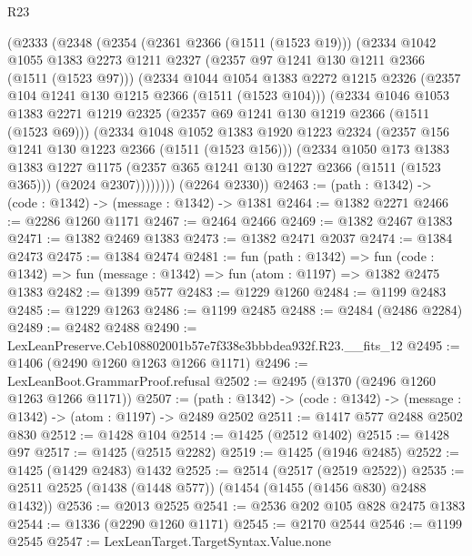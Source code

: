 \begin{lexlean}{R23}
\begin{coremodule}
    (@2333
      (@2348
        (@2354
          (@2361 @2366 (@1511 (@1523 @19)))
          (@2334
            @1042
            @1055
            @1383
            @2273
            @1211
            @2327
            (@2357 @97 @1241 @130 @1211 @2366 (@1511 (@1523 @97)))
            (@2334
              @1044
              @1054
              @1383
              @2272
              @1215
              @2326
              (@2357 @104 @1241 @130 @1215 @2366 (@1511 (@1523 @104)))
              (@2334
                @1046
                @1053
                @1383
                @2271
                @1219
                @2325
                (@2357 @69 @1241 @130 @1219 @2366 (@1511 (@1523 @69)))
                (@2334
                  @1048
                  @1052
                  @1383
                  @1920
                  @1223
                  @2324
                  (@2357 @156 @1241 @130 @1223 @2366 (@1511 (@1523 @156)))
                  (@2334
                    @1050
                    @173
                    @1383
                    @1383
                    @1227
                    @1175
                    (@2357 @365 @1241 @130 @1227 @2366 (@1511 (@1523 @365)))
                    (@2024 @2307))))))))
      (@2264 @2330))
@2463 := (path : @1342) -> (code : @1342) -> (message : @1342) -> @1381
@2464 := @1382 @2271
@2466 := @2286 @1260 @1171
@2467 := @2464 @2466
@2469 := @1382 @2467 @1383
@2471 := @1382 @2469 @1383
@2473 := @1382 @2471 @2037
@2474 := @1384 @2473
@2475 := @1384 @2474
@2481 := fun (path : @1342) =>
  fun (code : @1342) => fun (message : @1342) => fun (atom : @1197) => @1382 @2475 @1383
@2482 := @1399 @577
@2483 := @1229 @1260
@2484 := @1199 @2483
@2485 := @1229 @1263
@2486 := @1199 @2485
@2488 := @2484 (@2486 @2284)
@2489 := @2482 @2488
@2490 := LexLeanPreserve.Ceb108802001b57e7f338e3bbbdea932f.R23.__fits_12
@2495 := @1406 (@2490 @1260 @1263 @1266 @1171)
@2496 := LexLeanBoot.GrammarProof.refusal
@2502 := @2495 (@1370 (@2496 @1260 @1263 @1266 @1171))
@2507 := (path : @1342) -> (code : @1342) -> (message : @1342) -> (atom : @1197) -> @2489 @2502
@2511 := @1417 @577 @2488 @2502 @830
@2512 := @1428 @104
@2514 := @1425 (@2512 @1402)
@2515 := @1428 @97
@2517 := @1425 (@2515 @2282)
@2519 := @1425 (@1946 @2485)
@2522 := @1425 (@1429 @2483) @1432
@2525 := @2514 (@2517 (@2519 @2522))
@2535 := @2511 @2525 (@1438 (@1448 @577)) (@1454 (@1455 (@1456 @830) @2488 @1432))
@2536 := @2013 @2525
@2541 := @2536 @202 @105 @828 @2475 @1383
@2544 := @1336 (@2290 @1260 @1171)
@2545 := @2170 @2544
@2546 := @1199 @2545
@2547 := LexLeanTarget.TargetSyntax.Value.none

\end{coremodule}
\end{lexlean}

